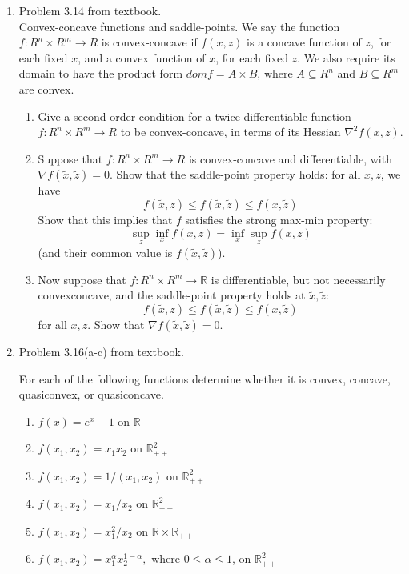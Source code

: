 \documentclass[12pt,letter]{article}
\newcommand{\R}{\mathbb{R}}
\begin{document}
\begin{enumerate}
\item Problem 3.14 from textbook.\\
  Convex-concave functions and saddle-points. We say the function $f: R^n \times R^m \to R$ is convex-concave if $f(x, z)$ is a concave function of $z$, for each fixed $x$, and a convex function of $x$, for each fixed $z$. We also require its domain to have the product form $dom f = A \times B$, where $A \subseteq R^n$ and $B \subseteq R^m$ are convex.\\
  \begin{enumerate}
  \item Give a second-order condition for a twice differentiable function $f : R^n \times R^m \to R$ to be convex-concave, in terms of its Hessian $\nabla^2 f(x, z)$.
  \item Suppose that $f: R^n \times R^m \to R$ is convex-concave and differentiable, with $\nabla f(\tilde{x}, \tilde{z}) = 0$. Show that the saddle-point property holds: for all $x, z$, we have \[f(\tilde{x}, z) \leq f(\tilde{x}, \tilde{z}) \leq f(x, \tilde{z})\]
    Show that this implies that $f$ satisfies the strong max-min property: \[\sup_z \inf_x f(x, z) = \inf_x \sup_z f(x, z)\] (and their common value is $f(\tilde{x}, \tilde{z})$).
  \item Now suppose that $f: R^n \times R^m \to \R$ is differentiable, but not necessarily convexconcave, and the saddle-point property holds at $\tilde{x}, \tilde{z}$: \[f(\tilde{x}, z) \leq f(\tilde{x}, \tilde{z}) \leq  f(x, \tilde{z})\] for all $x, z$. Show that $\nabla f(\tilde{x}, \tilde{z}) = 0$.
  \end{enumerate}
\item Problem 3.16(a-c) from textbook.

  For each of the following functions determine whether it is convex, concave, quasiconvex, or quasiconcave.\\
  \begin{enumerate}
  \item $f(x) = e^x - 1$ on $\R$
  \item $f(x_1 , x_2 ) = x_1 x_2$ on $\R^2_{++}$
  \item $f(x_1 , x_2 ) = 1/(x_1, x_2)$ on $\R^2_{++}$
  \item $f(x_1 , x_2 ) = x_1 / x_2$ on $\R^2_{++}$
  \item $f(x_1 , x_2 ) = x_1^2 / x_2$ on $\R \times \R_{++}$
  \item $f(x_1 , x_2 ) = x_1^{\alpha} x_2^{1−\alpha},$ where $0 \leq \alpha \leq 1$, on $\R^2_{++}$
  \end{enumerate}


\end{enumerate}
\end{document}
